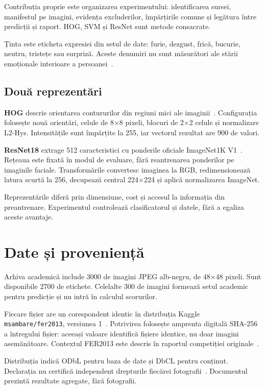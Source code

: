 \documentclass[conference]{IEEEtran}
\begin{document}
Contribuția proprie este organizarea experimentului: identificarea sursei, manifestul pe imagini, evidența excluderilor, împărțirile comune și legătura între predicții și raport. HOG, SVM și ResNet sunt metode consacrate.

Ținta este eticheta expresiei din setul de date: furie, dezgust, frică, bucurie, neutru, tristețe sau surpriză. Aceste denumiri nu sunt măsurători ale stării emoționale interioare a persoanei~\cite{barrett}.

\subsection{Două reprezentări}
\textbf{HOG} descrie orientarea contururilor din regiuni mici ale imaginii~\cite{hog}. Configurația folosește nouă orientări, celule de 8$\times$8 pixeli, blocuri de 2$\times$2 celule și normalizare L2-Hys. Intensitățile sunt împărțite la 255, iar vectorul rezultat are 900 de valori.

\textbf{ResNet18} extrage 512 caracteristici cu ponderile oficiale ImageNet1K V1~\cite{resnet}. Rețeaua este fixată în modul de evaluare, fără reantrenarea ponderilor pe imaginile faciale. Transformările convertesc imaginea la RGB, redimensionează latura scurtă la 256, decupează central 224$\times$224 și aplică normalizarea ImageNet.

Reprezentările diferă prin dimensiune, cost și accesul la informația din preantrenare. Experimentul controlează clasificatorul și datele, fără a egaliza aceste avantaje.

\section{Date și proveniență}
Arhiva academică include 3000 de imagini JPEG alb-negru, de 48$\times$48 pixeli. Sunt disponibile 2700 de etichete. Celelalte 300 de imagini formează setul academic pentru predicție și nu intră în calculul scorurilor.

Fiecare fișier are un corespondent identic în distribuția Kaggle \texttt{msambare/fer2013}, versiunea 1~\cite{kaggle}. Potrivirea folosește amprenta digitală SHA-256 a întregului fișier: aceeași valoare identifică fișiere identice, nu doar imagini asemănătoare. Contextul FER2013 este descris în raportul competiției originale~\cite{fer}.

Distribuția indică ODbL pentru baza de date și DbCL pentru conținut. Declarația nu certifică independent drepturile fiecărei fotografii~\cite{license}. Documentul prezintă rezultate agregate, fără fotografii.
\end{document}
